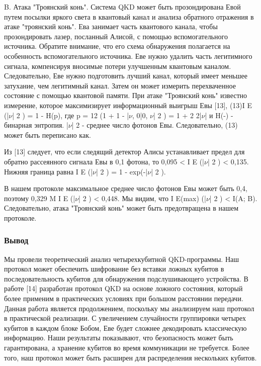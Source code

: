 B. Атака "Троянский конь". Система QKD может быть прозондирована Евой путем посылки яркого света в квантовый канал и анализа обратного отражения в атаке "троянский конь". Ева занимает часть квантового канала, чтобы прозондировать лазер, посланный Алисой, с помощью вспомогательного источника. Обратите внимание, что его схема обнаружения полагается на особенность вспомогательного источника. Еве нужно удалить часть легитимного сигнала, компенсируя вносимые потери улучшенным квантовым каналом. Следовательно, Еве нужно подготовить лучший канал, который имеет меньшее затухание, чем легитимный канал. Затем он может измерить перехваченное состояние с помощью квантовой памяти.
При атаке "Троянский конь" известно измерение, которое максимизирует информационный выигрыш Евы [13], (13)I E (|$\nu$| 2 ) = 1 - H(p), где p = 12 (1 + 1 - |$\nu$, 0|0, $\nu$| 2 ) = 1 + 2 2|$\nu$| и H(-) - бинарная энтропия. |$\nu$| 2 - среднее число фотонов Евы. Следовательно, (13) может быть переписано как.

Из [13] следует, что если следящий детектор Алисы устанавливает предел для обратно рассеянного сигнала Евы в 0,1 фотона, то 0,095 < I E (|$\nu$| 2 ) < 0,135. Нижняя граница равна I E (|$\nu$| 2 ) = 1 - exp(-|$\nu$| 2 ).

В нашем протоколе максимальное среднее число фотонов Евы может быть 0,4, поэтому 0,329 M I E (|$\nu$| 2 ) < 0,448. Мы видим, что I E(max) (|$\nu$| 2 ) < I(A; B). Следовательно, атака "Троянский конь" может быть предотвращена в нашем протоколе.

\subsubsection{Вывод}
Мы провели теоретический анализ четырехкубитной QKD-программы. Наш протокол может обеспечить шифрование без вставки ложных кубитов в последовательность кубитов для обнаружения подслушивающего устройства. В работе [14] разработан протокол QKD на основе ложного состояния, который более применим в практических условиях при большом расстоянии передачи. Данная работа является продолжением, поскольку мы анализируем наш протокол в практической реализации. С увеличением случайности группировки четырех кубитов в каждом блоке Бобом, Еве будет сложнее декодировать классическую информацию. Наши результаты показывают, что безопасность может быть гарантирована, а хранение кубитов во время коммуникации не требуется. Более того, наш протокол может быть расширен для распределения нескольких кубитов.


\subsection{\review}



